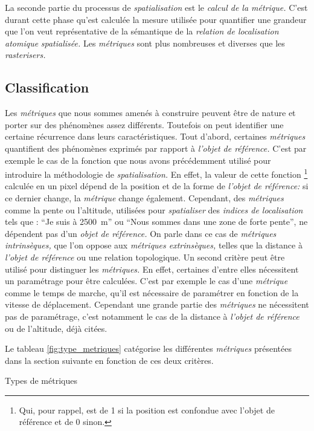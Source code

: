 La seconde partie du processus de \emph{spatialisation} est le
\emph{calcul de la métrique.} C'est durant cette phase qu'est calculée
la mesure utilisée pour quantifier une grandeur que l'on veut
représentative de la sémantique de la \emph{relation de localisation
  atomique} \emph{spatialisée.} Les \emph{métriques} sont plus
nombreuses et diverses que les \emph{rasterisers.}

\subsection{Classification}
Les \emph{métriques} que nous sommes amenés à construire peuvent être
de nature et porter sur des phénomènes assez différents. Toutefois on
peut identifier une certaine récurrence dans leurs
caractéristiques. Tout d'abord, certaines \emph{métriques} quantifient
des phénomènes exprimés par rapport à \emph{l'objet de référence.}
C'est par exemple le cas de la fonction que nous avons précédemment
utilisé pour introduire la méthodologie de \emph{spatialisation.} En
effet, la valeur de cette fonction \footnote{Qui, pour rappel, est de
  1 si la position est confondue avec l'objet de référence et de 0
  sinon.} calculée en un pixel dépend de la position et de la forme de
\emph{l'objet de référence:} si ce dernier change, la \emph{métrique}
change également. Cependant, des \emph{métriques} comme la pente ou
l'altitude, utilisées pour \emph{spatialiser} des \emph{indices de
  localisation} tels que : \enquote{Je suis à \SI{2500}{\meter}} ou
\enquote{Nous sommes dans une zone de forte pente}, ne dépendent pas
d'un \emph{objet de référence.} On parle dans ce cas de
\emph{métriques intrinsèques,} que l'on oppose aux \emph{métriques
  extrinsèques,} telles que la distance à \emph{l'objet de référence}
ou une relation topologique. Un second critère peut être utilisé pour
distinguer les \emph{métriques.}  En effet, certaines d'entre elles
nécessitent un paramétrage pour être calculées. C'est par exemple le
cas d'une \emph{métrique} comme le temps de marche, qu'il est
nécessaire de paramétrer en fonction de la vitesse de
déplacement. Cependant une grande partie des \emph{métriques} ne
nécessitent pas de paramétrage, c'est notamment le cas de la distance
à \emph{l'objet de référence} ou de l'altitude, déjà citées.

Le tableau \ref{fig:type_metriques} catégorise les différentes
\emph{métriques} présentées dans la section suivante en fonction de
ces deux critères.

\begin{table}
  \centering
  
  \caption{Types de métriques}
  \label{fig:type_metriques}
\end{table}

